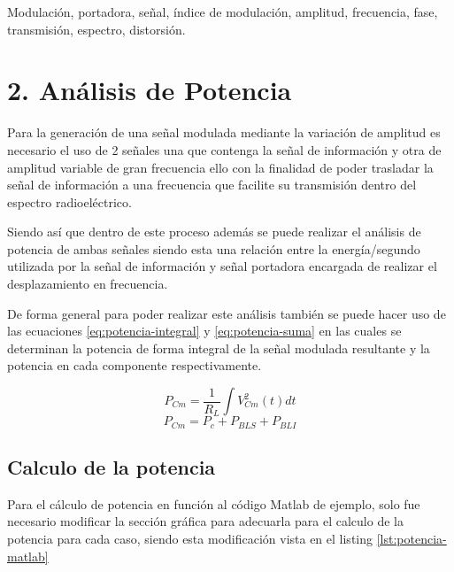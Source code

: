 \documentclass[conference]{IEEEtran}
\begin{document}
	\begin{IEEEkeywords}
		Modulación, portadora, señal, índice de modulación, amplitud, frecuencia, fase, transmisión, espectro, distorsión.
	\end{IEEEkeywords}
	
	\section{2. Análisis de Potencia}
	Para la generación de una señal modulada mediante la variación de amplitud es necesario el uso de 2 señales una que contenga la señal de información y otra de amplitud variable de gran frecuencia ello con la finalidad de poder trasladar la señal de información a una frecuencia que facilite su transmisión dentro del espectro radioeléctrico.
	
	Siendo así que dentro de este proceso además se puede realizar el análisis de potencia de ambas señales siendo esta una relación entre la energía/segundo utilizada por la señal de información y señal portadora encargada de realizar el desplazamiento en frecuencia.
	
	De forma general para poder realizar este análisis también se puede hacer uso de las ecuaciones \ref{eq:potencia-integral} y \ref{eq:potencia-suma} en las cuales se determinan la potencia de forma integral de la señal modulada resultante y la potencia en cada componente respectivamente.
	
	\begin{equation}
		P_{Cm} = \frac{1}{R_{L}} \int V_{Cm}^2(t)dt
		\label{eq:potencia-integral}
	\end{equation}
	\begin{equation}
		P_{Cm} = P_{c} + P_{BLS} + P_{BLI}
		\label{eq:potencia-suma}
	\end{equation}
	
	\subsection{\textbf{Calculo de la potencia}}
	Para el cálculo de potencia en función al código Matlab de ejemplo, solo fue necesario modificar la sección gráfica para adecuarla para el calculo de la potencia para cada caso, siendo esta modificación vista en el listing \ref{lst:potencia-matlab}
	
\end{document}
